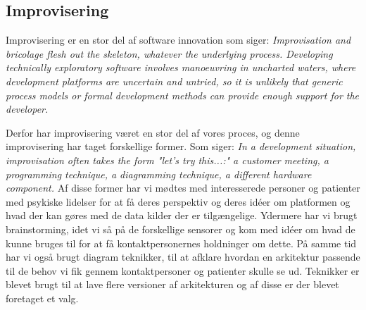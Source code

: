 \subsection{Improvisering}
Improvisering er en stor del af software innovation som \citet[side 56]{book:softwareinnovation} siger: \textit{Improvisation and bricolage flesh out the skeleton, whatever the underlying process. Developing technically exploratory software involves manoeuvring in uncharted waters, where development platforms are uncertain and untried, so it is unlikely that generic process models or formal development methods can provide enough support for the developer.}

Derfor har improvisering været en stor del af vores proces, og denne improvisering har taget forskellige former.
Som \citet[side 56]{book:softwareinnovation} siger: \textit{In a development situation, improvisation often takes the form "let's try this...:" a customer meeting, a programming technique, a diagramming technique, a different hardware component.}
Af disse former har vi mødtes med interesserede personer og patienter med psykiske lidelser for at få deres perspektiv og deres idéer om platformen og hvad der kan gøres med de data kilder der er tilgængelige. 
Ydermere har vi brugt brainstorming, idet vi så på de forskellige sensorer og kom med idéer om hvad de kunne bruges til for at få kontaktpersonernes holdninger om dette.
På samme tid har vi også brugt diagram teknikker, til at afklare hvordan en arkitektur passende til de behov vi fik gennem kontaktpersoner og patienter skulle se ud.
Teknikker er blevet brugt til at lave flere versioner af arkitekturen og af disse er der blevet foretaget et valg.
